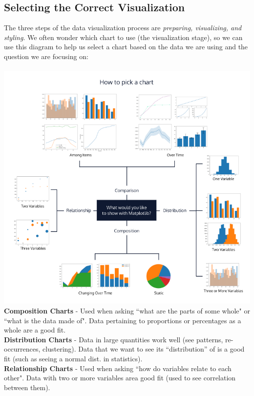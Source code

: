 \documentclass[11pt, a4paper]{article}
\begin{document}
\begin{spacing}{1.1}
	\subsection{Selecting the Correct Visualization}
	The three steps of the data visualization process are \textit{preparing, visualizing, and styling}. We often wonder which chart to use (the visualization stage), so we can use this diagram to help us select a chart based on the data we are using and the question we are focusing on: \\~\\
	\includegraphics[scale=.8]{visdiag} \\
	\textbf{Composition Charts} - Used when asking ``what are the parts of some whole" or ``what is the data made of". Data pertaining to proportions or percentages as a whole are a good fit. \vspace*{2mm} \\
	\textbf{Distribution Charts} - Data in large quantities work well (see patterns, re-occurrences, clustering). Data that we want to see its ``distribution'' of is a good fit (such as seeing a normal dist. in statistics). \vspace*{2mm} \\
	\textbf{Relationship Charts} - Used when asking ``how do variables relate to each other". Data with two or more variables area good fit (used to see correlation between them). \vspace*{2mm} \\

\end{spacing}
\end{document}
